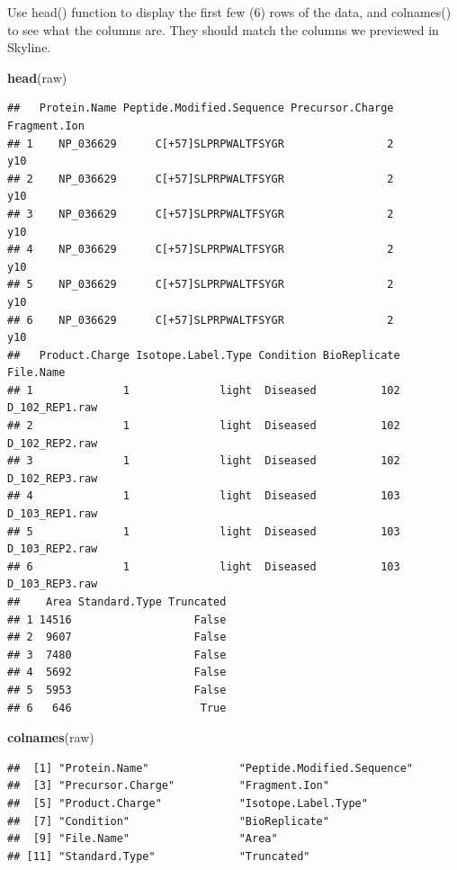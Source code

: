 \documentclass[]{book}
\newenvironment{Shaded}{\begin{snugshade}}{\end{snugshade}}
\newcommand{\KeywordTok}[1]{\textcolor[rgb]{0.13,0.29,0.53}{\textbf{#1}}}
\newcommand{\NormalTok}[1]{#1}
\begin{document}
Use head() function to display the first few (6) rows of the data, and colnames() to see what the columns are. They should match the columns we previewed in Skyline.

\begin{Shaded}
\begin{Highlighting}[]
\KeywordTok{head}\NormalTok{(raw)}
\end{Highlighting}
\end{Shaded}

\begin{verbatim}
##   Protein.Name Peptide.Modified.Sequence Precursor.Charge Fragment.Ion
## 1    NP_036629      C[+57]SLPRPWALTFSYGR                2          y10
## 2    NP_036629      C[+57]SLPRPWALTFSYGR                2          y10
## 3    NP_036629      C[+57]SLPRPWALTFSYGR                2          y10
## 4    NP_036629      C[+57]SLPRPWALTFSYGR                2          y10
## 5    NP_036629      C[+57]SLPRPWALTFSYGR                2          y10
## 6    NP_036629      C[+57]SLPRPWALTFSYGR                2          y10
##   Product.Charge Isotope.Label.Type Condition BioReplicate      File.Name
## 1              1              light  Diseased          102 D_102_REP1.raw
## 2              1              light  Diseased          102 D_102_REP2.raw
## 3              1              light  Diseased          102 D_102_REP3.raw
## 4              1              light  Diseased          103 D_103_REP1.raw
## 5              1              light  Diseased          103 D_103_REP2.raw
## 6              1              light  Diseased          103 D_103_REP3.raw
##    Area Standard.Type Truncated
## 1 14516                   False
## 2  9607                   False
## 3  7480                   False
## 4  5692                   False
## 5  5953                   False
## 6   646                    True
\end{verbatim}

\begin{Shaded}
\begin{Highlighting}[]
\KeywordTok{colnames}\NormalTok{(raw)}
\end{Highlighting}
\end{Shaded}

\begin{verbatim}
##  [1] "Protein.Name"              "Peptide.Modified.Sequence"
##  [3] "Precursor.Charge"          "Fragment.Ion"             
##  [5] "Product.Charge"            "Isotope.Label.Type"       
##  [7] "Condition"                 "BioReplicate"             
##  [9] "File.Name"                 "Area"                     
## [11] "Standard.Type"             "Truncated"
\end{verbatim}
\end{document}
